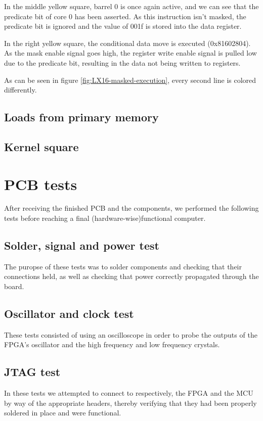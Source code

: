 \documentclass[../main/report.tex]{subfiles}
\begin{document}
In the middle yellow square, barrel 0 is once again active, and we can see that the predicate bit of core 0 has been asserted.
As this instruction isn't masked, the predicate bit is ignored and the value of 001f is stored into the data register.

In the right yellow square, the conditional data move is executed (0x81602804).
As the mask enable signal goes high, the register write enable signal is pulled low due to the predicate bit, resulting in the data not being written to registers.

As can be seen in figure \ref{fig:LX16-masked-execution}, every second line is colored differently.


\subsection{Loads from primary memory}

\subsection{Kernel square}





\section{PCB tests}

After receiving the finished PCB and the components, we performed the following tests before reaching a final (hardware-wise)functional computer.   

\subsection{Solder, signal and power test}
The puropse of these tests was to solder components and checking that their connections held, as well as checking that power correctly propagated through the board.  


\subsection{Oscillator and clock test}
These tests consisted of using an oscilloscope in order to probe the outputs of the FPGA's oscillator and the high frequency and low frequency crystals.


\subsection{JTAG test}
In these tests we attempted to connect to respectively, the FPGA and the MCU by way of the appropriate headers, thereby verifying that they had been properly soldered in place and were functional.

\end{document}
